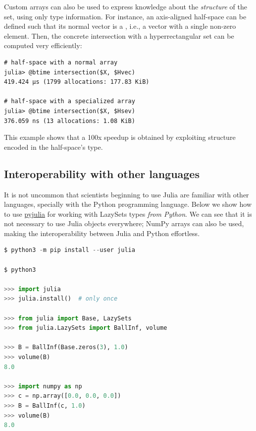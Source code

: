 \smallskip

Custom arrays can also be used to express knowledge about the \emph{structure} of the set, using only type information. For instance, an axis-aligned half-space can be defined such that its normal vector is a , i.e., a vector with a single non-zero element.
%
Then, the concrete intersection with a hyperrectangular set can be computed very efficiently:

\begin{minipage}{\linewidth}
\vspace{-\abovedisplayskip}
\begin{lstlisting}
# half-space with a normal array
julia> @btime intersection($X, $Hvec)
419.424 μs (1799 allocations: 177.83 KiB)

# half-space with a specialized array
julia> @btime intersection($X, $Hsev)
376.059 ns (13 allocations: 1.08 KiB)
\end{lstlisting}
\end{minipage}
This example shows that a 100x speedup is obtained by exploiting structure encoded in the half-space's type.

\subsection{Interoperability with other languages}\label{sec:python}

It is not uncommon that scientists beginning to use Julia are familiar with other languages, specially with the Python programming language.
%
Below we show how to use \href{https://github.com/JuliaPy/pyjulia}{pyjulia} for working with LazySets types \emph{from Python}.
%
We can see that it is not necessary to use Julia objects everywhere; NumPy arrays can also be used, making the interoperability between Julia and Python effortless.

\begin{minipage}{\linewidth}
	\vspace{-\abovedisplayskip}
	\begin{lstlisting}[language=python]
$ python3 -m pip install --user julia

$ python3

>>> import julia
>>> julia.install()  # only once

>>> from julia import Base, LazySets
>>> from julia.LazySets import BallInf, volume

>>> B = BallInf(Base.zeros(3), 1.0)
>>> volume(B)
8.0

>>> import numpy as np
>>> c = np.array([0.0, 0.0, 0.0])
>>> B = BallInf(c, 1.0)
>>> volume(B)
8.0
	\end{lstlisting}
\end{minipage}
